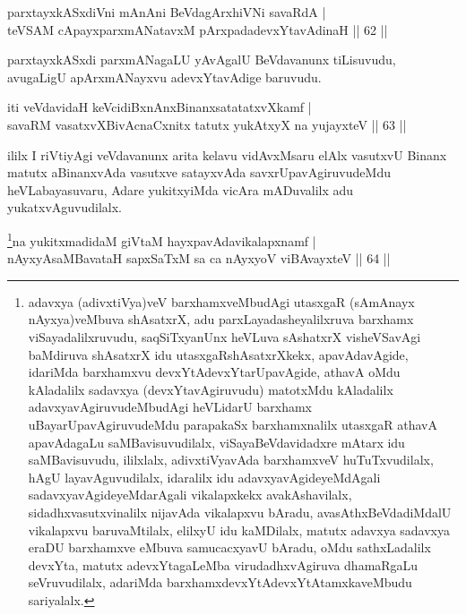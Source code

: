 \begin{shl}
parxtayxkASxdiVni mAnAni BeVdagArxhiVNi savaRdA  | \\
teVSAM cApayxparxmANatavxM pArxpadadevxYtavAdinaH \hfill||  62 ||  
\end{shl}

\begin{artha}
parxtayxkASxdi parxmANagaLU yAvAgalU BeVdavanunx tiLisuvudu, avugaLigU apArxmANayxvu adevxYtavAdige baruvudu.
\end{artha}


\begin{shl}
iti veVdavidaH keVcidiBxnAnxBinanxsatatatxvXkamf  | \\
savaRM vasatxvXBivAcnaCxnitx tatutx yukAtxyX na yujayxteV \hfill||  63 ||  
\end{shl}

\begin{artha}
ililx I riVtiyAgi veVdavanunx arita kelavu vidAvxMsaru elAlx vasutxvU Binanx matutx aBinanxvAda vasutxve satayxvAda savxrUpavAgiruvudeMdu heVLabayasuvaru, Adare yukitxyiMda vicAra mADuvalilx adu yukatxvAguvudilalx.
\end{artha}



\begin{shl}
\footnote{adavxya (adivxtiVya)veV barxhamxveMbudAgi utasxgaR (sAmAnayx nAyxya)veMbuva shAsatxrX, adu parxLayadasheyalilxruva barxhamx viSayadalilxruvudu, saqSiTxyanUnx heVLuva sAshatxrX visheVSavAgi baMdiruva shAsatxrX idu utasxgaRshAsatxrXkekx, apavAdavAgide, idariMda barxhamxvu devxYtAdevxYtarUpavAgide, athavA oMdu kAladalilx sadavxya (devxYtavAgiruvudu) matotxMdu kAladalilx adavxyavAgiruvudeMbudAgi heVLidarU barxhamx uBayarUpavAgiruvudeMdu parapakaSx barxhamxnalilx utasxgaR athavA apavAdagaLu saMBavisuvudilalx, viSayaBeVdavidadxre mAtarx idu saMBavisuvudu, ililxlalx, adivxtiVyavAda barxhamxveV huTuTxvudilalx, hAgU layavAguvudilalx, idaralilx idu adavxyavAgideyeMdAgali sadavxyavAgideyeMdarAgali vikalapxkekx avakAshavilalx, sidadhxvasutxvinalilx nijavAda vikalapxvu bAradu, avasAthxBeVdadiMdalU vikalapxvu baruvaMtilalx, elilxyU idu kaMDilalx, matutx adavxya sadavxya eraDU barxhamxve eMbuva samucacxyavU bAradu, oMdu sathxLadalilx devxYta, matutx adevxYtagaLeMba virudadhxvAgiruva dhamaRgaLu seVruvudilalx, adariMda barxhamxdevxYtAdevxYtAtamxkaveMbudu sariyalalx.}na yukitxmadidaM giVtaM hayxpavAdavikalapxnamf  | \\
nAyxyAsaMBavataH sapxSaTxM sa ca nAyxyoV viBAvayxteV \hfill||  64 ||  
\end{shl}

